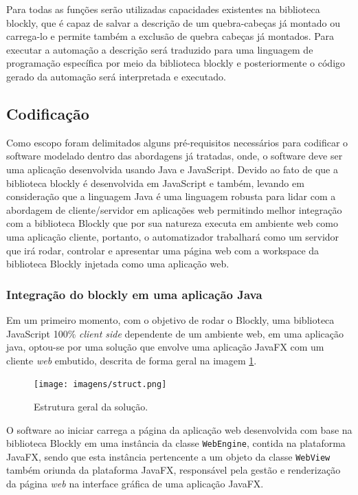 \documentclass[tg]{mdtufsm}
\begin{document}
                Para todas as funções serão utilizadas capacidades existentes na biblioteca blockly, que é capaz de salvar a descrição de um quebra-cabeças já montado ou carrega-lo e permite também a exclusão de quebra cabeças já montados. Para executar a automação a descrição será traduzido para uma linguagem de programação específica por meio da biblioteca blockly e posteriormente o código gerado da automação será interpretada e executado.

            \subsection {Codificação}

                Como escopo foram delimitados alguns pré-requisitos necessários para codificar o software modelado dentro das abordagens já tratadas, onde, o software deve ser uma aplicação desenvolvida usando Java e JavaScript. Devido ao fato de que a biblioteca blockly é desenvolvida em JavaScript e também, levando em consideração que a linguagem Java é uma linguagem robusta para lidar com a abordagem de cliente/servidor em aplicações web permitindo melhor integração com a biblioteca Blockly que por sua natureza executa em ambiente web como uma aplicação cliente, portanto, o automatizador trabalhará como um servidor que irá rodar, controlar e apresentar uma página web com a workspace da biblioteca Blockly injetada como uma aplicação web.

                \subsubsection {Integração do blockly em uma aplicação Java}

                    Em um primeiro momento, com o objetivo de rodar o Blockly, uma biblioteca JavaScript 100\% \emph{client side} dependente de um ambiente web, em uma aplicação java, optou-se por uma solução que envolve uma aplicação JavaFX com um cliente \emph{web} embutido, descrita de forma geral na imagem \ref{fig:struct}.

                    \begin{figure}[!htb]
                        {\centering
                        \texttt{[image: imagens/struct.png]}
                        \caption{Estrutura geral da solução.}
                        \label{fig:struct}}
                    \end{figure}

                    O software ao iniciar carrega a página da aplicação web desenvolvida com base na biblioteca Blockly em uma instância da classe \texttt{WebEngine}, contida na plataforma JavaFX, sendo que esta instância pertencente a um objeto da classe \texttt{WebView} também oriunda da plataforma JavaFX, responsável pela gestão e renderização da página \emph{web} na interface gráfica de uma aplicação JavaFX.
\end{document}
